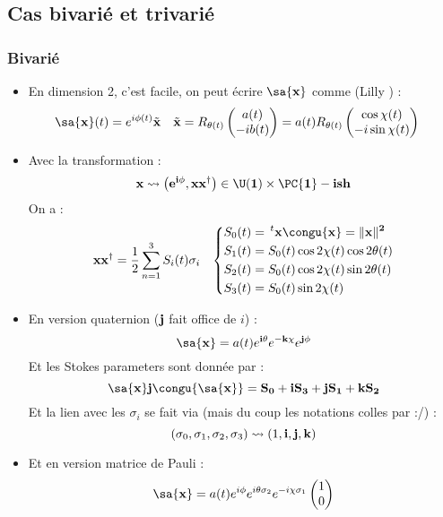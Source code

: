 \subsection{Cas bivarié et trivarié}

\subsubsection{Bivarié}

\begin{itemize}
	
	\item En dimension 2, c'est facile, on peut écrire $\sa{\bf{x}}$ comme (Lilly \cite{lilly_bivariate_2010,lilly_wavelet_2006}) :
	\begin{align}\label{eq:exp_elliptik}
		\sa{\bf{x}}(t) &= e^{i\phi(t)} \Tilde{\bf{x}}  &  \Tilde{\bf{x}} &= R_{\theta(t)}\begin{pmatrix} a(t) \\ -ib(t) \end{pmatrix} = a(t) R_{\theta(t)} \begin{pmatrix} \cos\chi(t) \\ -i\sin\chi(t) \end{pmatrix}
	\end{align}
	
	\item Avec la transformation :
	\[\bf{x} \leadsto \big(e^{i\phi}, \bf{x}\bf{x}^\dagger\big)\in\U(1)\times \PC{1}-ish\]
	On a :
	\begin{align*}
		\bf{x}\bf{x}^\dagger &= \frac{1}{2}\sum_{n=1}^3 S_i(t)\sigma_i  &  \left\{\begin{aligned}
			S_0(t) &=\, ^t\bf{x}\congu{\bf{x}} = \|\bf{x}\|^2 \\
			S_1(t) &= S_0(t) \cos 2\chi(t)\cos 2\theta(t)\\
			S_2(t) &= S_0(t) \cos 2\chi(t)\sin 2\theta(t)\\
			S_3(t) &= S_0(t) \sin 2\chi(t)
		\end{aligned} \right.
	\end{align*}
	
	\item En version quaternion ($\bf{j}$ fait office de $i$) \cite{lefevre_polarization_2021} :
	\begin{equation}
		\sa{\bf{x}} = a(t)e^{\bf{i}\theta} e^{-\bf{k}\chi} e^{\bf{j}\phi}
	\end{equation}
	Et les Stokes parameters sont donnée par :
	\[\sa{\bf{x}} \bf{j} \congu{\sa{\bf{x}}} = S_0  +\bf{i}S_3 + \bf{j}S_1 + \bf{k}S_2\]
	Et la lien avec les $\sigma_i$ se fait via (mais du coup les notations colles par :/) :
	\[(\sigma_0, \sigma_1, \sigma_2, \sigma_3) \leadsto (1, \bf{i}, \bf{j}, \bf{k})\]
	
	\item Et en version matrice de Pauli :
	\begin{equation}
		\sa{\bf{x}} = a(t)e^{i\phi} e^{i\theta \sigma_2} e^{-i\chi \sigma_1} \begin{pmatrix} 1 \\ 0 \end{pmatrix}
	\end{equation}
\end{itemize}
